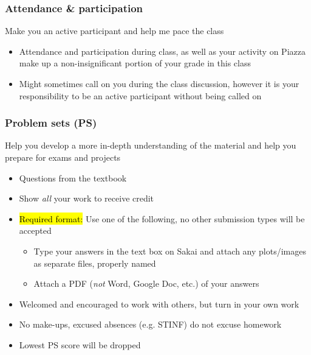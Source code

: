 \documentclass[11pt,containsverbatim,handout,xcolor=xelatex,dvipsnames,table]{beamer}
\begin{document}

\begin{frame}
\frametitle{Attendance \& participation}

 Make you an active participant and help me pace the class 

\begin{itemize}

\item Attendance and participation during class, as well as your activity on Piazza make up a non-insignificant portion of your grade in this class

\item Might sometimes call on you during the class discussion, however it is your responsibility to be an active participant without being called on

\end{itemize}

\end{frame}


\begin{frame}
\frametitle{Problem sets (PS)}

 Help you develop a more in-depth understanding of the material and help you prepare for exams and projects

\begin{itemize}

\item Questions from the textbook

\item Show \emph{all} your work to receive credit

\item \hl{Required format:} Use one of the following, no other submission types will be accepted
\begin{itemize}
\item Type your answers in the text box on Sakai and attach any plots/images as separate files, properly named
\item Attach a PDF (\emph{not} Word, Google Doc, etc.) of your answers
\end{itemize}

\item Welcomed and encouraged to work with others, but turn in your own work

\item No make-ups, excused absences (e.g. STINF) do not excuse homework

\item Lowest PS score will be dropped

\end{itemize}

\end{frame}
\end{document}
